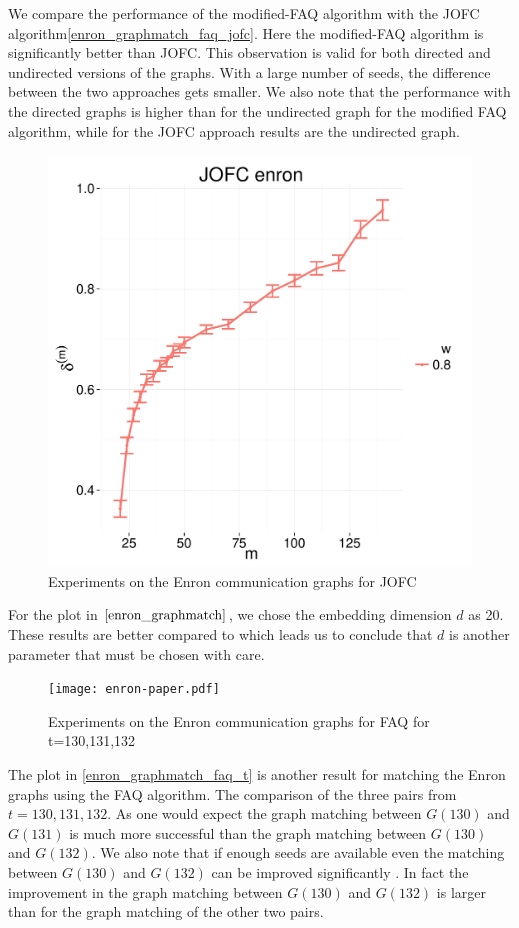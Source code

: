 \documentclass[12pt,oneside,final]{thesis}\usepackage[]{graphicx}\usepackage[]{color}
\begin{document}
We compare the performance of the modified-FAQ algorithm with the JOFC algorithm\ref{enron_graphmatch_faq_jofc}. Here the modified-FAQ algorithm is significantly better than JOFC. This observation  is valid for both directed and undirected versions of the graphs.  With a large  number of seeds, the difference between the two approaches gets smaller. We also note that the performance with the directed graphs is higher than for the undirected graph for the modified FAQ algorithm, while for the JOFC approach  results are   the undirected graph.

\begin{figure}
\includegraphics[scale=0.75]{JOFC-enron_dim_20}
\caption{Experiments on the Enron communication graphs for JOFC \label{enron_graphmatch}}
\end{figure}

For the plot in  $\ref{enron_graphmatch}$, we chose the embedding dimension $d$ as 20. These results are better compared to \label{enron_graphmatch_faq_jofc} which leads us to conclude that $d$ is another parameter that must be chosen with care. 


\begin{figure}
\texttt{[image: enron-paper.pdf]}
\caption{Experiments on the Enron communication graphs for FAQ for t=130,131,132 \label{enron_graphmatch_faq_t}}
\end{figure}
The plot in \autoref{enron_graphmatch_faq_t} is another result for matching the Enron graphs using the FAQ algorithm. The comparison of the three pairs from $t=130,131,132$. As one would expect the graph matching between $G(130)$ and $G(131)$ is much more successful than    the graph matching between $G(130)$ and $G(132)$. We also note that if enough seeds are available even the matching between  $G(130)$ and $G(132)$ can be improved significantly . In fact the improvement in the graph matching between  $G(130)$ and $G(132)$  is larger than for the graph matching of the other two pairs.
\end{document}
